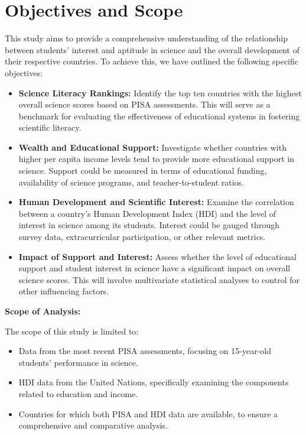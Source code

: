 \documentclass[12pt]{article}
\begin{document}
\section{Objectives and Scope}

\label{s.objectives}

This study aims to provide a comprehensive understanding of the relationship between students' interest and aptitude in science and the overall development of their respective countries. To achieve this, we have outlined the following specific objectives:

\begin{itemize}
\item \textbf{Science Literacy Rankings:} Identify the top ten countries with the highest overall science scores based on PISA assessments. This will serve as a benchmark for evaluating the effectiveness of educational systems in fostering scientific literacy.

\item \textbf{Wealth and Educational Support:} Investigate whether countries with higher per capita income levels tend to provide more educational support in science. Support could be measured in terms of educational funding, availability of science programs, and teacher-to-student ratios.

\item \textbf{Human Development and Scientific Interest:} Examine the correlation between a country's Human Development Index (HDI) and the level of interest in science among its students. Interest could be gauged through survey data, extracurricular participation, or other relevant metrics.

\item \textbf{Impact of Support and Interest:} Assess whether the level of educational support and student interest in science have a significant impact on overall science scores. This will involve multivariate statistical analyses to control for other influencing factors.
\end{itemize}

\textbf{Scope of Analysis:}

The scope of this study is limited to:

\begin{itemize}
\item Data from the most recent PISA assessments, focusing on 15-year-old students' performance in science.

\item HDI data from the United Nations, specifically examining the components related to education and income.

\item Countries for which both PISA and HDI data are available, to ensure a comprehensive and comparative analysis.
\end{itemize}
\end{document}
